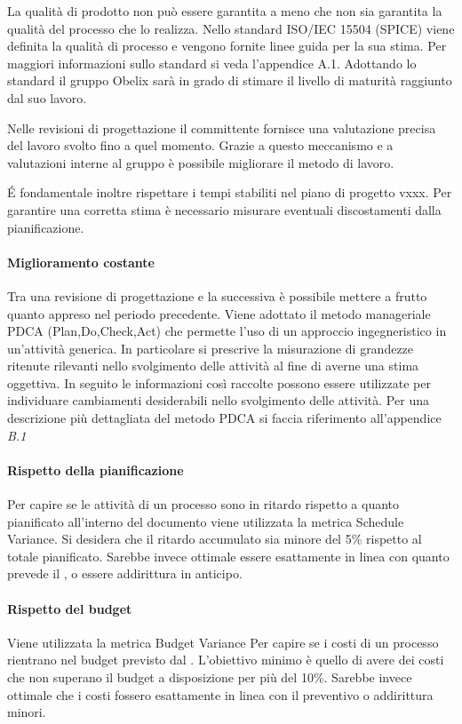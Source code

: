 La qualità di prodotto non può essere garantita a meno che non sia
garantita la qualità del processo che lo realizza. Nello standard
ISO/IEC 15504 (SPICE) viene definita la qualità di processo e vengono
fornite linee guida per la sua stima. Per maggiori informazioni sullo
standard si veda l'appendice A.1.
Adottando lo standard il gruppo Obelix sarà in grado di stimare
il livello di maturità raggiunto dal suo lavoro.

Nelle revisioni di progettazione il committente
fornisce una valutazione precisa del lavoro svolto fino a quel
momento.
Grazie a questo meccanismo e a valutazioni interne al gruppo è
possibile migliorare il metodo di lavoro.

\'E fondamentale inoltre rispettare i tempi stabiliti nel piano di
progetto vxxx. Per garantire una corretta stima è necessario misurare
eventuali discostamenti dalla pianificazione.

\paragraph{Miglioramento costante}

Tra una revisione di progettazione e la successiva è possibile
mettere a frutto quanto appreso nel periodo precedente.
Viene adottato il metodo manageriale PDCA (Plan,Do,Check,Act) che
permette l'uso di un approccio ingegneristico in un'attività generica.
In particolare si prescrive la misurazione di grandezze ritenute
rilevanti nello svolgimento delle attività al fine di averne una stima
oggettiva.
In seguito le informazioni così raccolte possono essere utilizzate per
individuare cambiamenti desiderabili nello svolgimento delle attività.
Per una descrizione più dettagliata del metodo PDCA si faccia
riferimento all'appendice \emph{B.1}


\paragraph{Rispetto della pianificazione}
Per capire se le attività di un processo sono in ritardo rispetto a
quanto pianificato all'interno del documento \emph{\pianodiprogetto} viene utilizzata la metrica Schedule Variance. Si desidera che
il ritardo accumulato sia minore del 5\% rispetto al totale
pianificato. Sarebbe invece ottimale essere esattamente in linea con
quanto prevede il \emph{\pianodiprogetto}, o essere addirittura
in anticipo.

\paragraph{Rispetto del budget}
Viene utilizzata la metrica Budget Variance Per capire se i costi di
un processo rientrano nel budget previsto dal \emph{\pianodiprogetto}.
L'obiettivo minimo è quello di avere dei costi che non superano il
budget a disposizione per più del 10\%. Sarebbe invece ottimale che i
costi fossero esattamente in linea con il preventivo o addirittura
minori.

